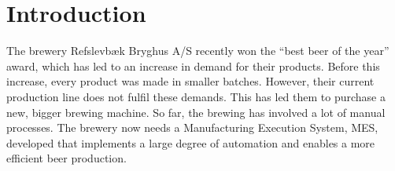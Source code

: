 \section{Introduction}
The brewery Refslevbæk Bryghus A/S recently won the “best beer of the year” 
award, which has led to an increase in demand for their products. Before this
increase, every product was made in smaller batches. However, their current
production line does not fulfil these demands. This has led them to purchase a
new, bigger brewing machine. So far, the brewing has involved a lot of manual
processes. The brewery now needs a Manufacturing Execution System, MES,
developed that implements a large degree of automation and enables a more
efficient beer production. \\


